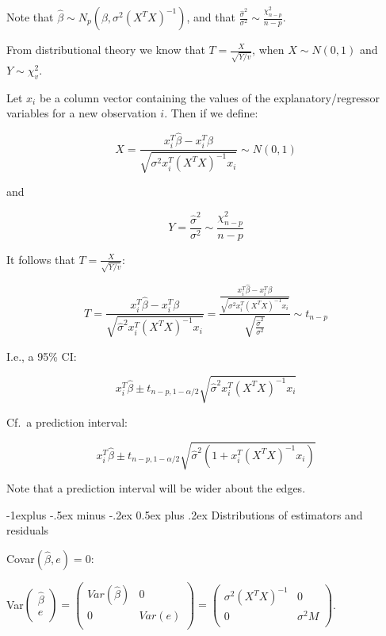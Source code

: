 \documentclass[10pt,landscape]{article}
\makeatletter
\renewcommand{\subsection}{\@startsection{subsection}{2}{0mm}%
                                {-1explus -.5ex minus -.2ex}%
                                {0.5ex plus .2ex}%
                                {\normalfont\normalsize\bfseries}}
\makeatother
\begin{document}
\begin{multicols}{3}
Note that $\hat{\beta} \sim N_p (\beta,\sigma^2 (X^T X)^{-1})$, and that 
$\frac{\hat{\sigma}^2}{\sigma^2} \sim  \frac{\chi^2_{n-p}}{n-p}$.

From distributional theory we know that $T=\frac{X}{\sqrt{Y/v}}$, when $X\sim N(0,1)$ and $Y\sim \chi^2_{v}$. 

Let 
 $x_i$ be a column vector containing the values of the explanatory/regressor variables for a new observation $i$. Then if we define:

\begin{equation}
X=\frac{x_i^T \hat{\beta} - x_i^T \beta}{\sqrt{\sigma^2 x_i^T (X^T X)^{-1}x_i}} \sim N(0,1)
\end{equation}

\noindent
and 

\begin{equation}
Y=\frac{\hat{\sigma}^2}{\sigma^2} \sim  \frac{\chi^2_{n-p}}{n-p}
\end{equation}


It follows that  $T=\frac{X}{\sqrt{Y/v}}$:

\begin{equation}
T=  \frac{x_i^T \hat{\beta} - x_i^T \beta}{\sqrt{\hat{\sigma}^2 x_i^T (X^T X)^{-1}x_i}} = 
\frac{  \frac{x_i^T \hat{\beta} - x_i^T \beta}{\sqrt{\sigma^2 x_i^T (X^T X)^{-1}x_i}}}{\sqrt{\frac{\hat{\sigma}^2}{\sigma^2}}}
 \sim t_{n-p}
\end{equation}

I.e., a 95\% CI:

\begin{equation}
x_i^T \hat{\beta} \pm t_{n-p,1-\alpha/2}\sqrt{\hat{\sigma}^2 x_i^T(X^T X)^{-1}x_i}
\end{equation}

Cf.\ a prediction interval:

\begin{equation}
x_i^T \hat{\beta} \pm t_{n-p,1-\alpha/2}\sqrt{\hat{\sigma}^2 (1+x_i^T(X^T X)^{-1}x_i)}
\end{equation}

Note that a prediction interval will be wider about the edges.

\subsection{Distributions of estimators and residuals}

Covar$(\hat{\beta},e)=0$: 

         Var$\begin{pmatrix}
	 \hat{\beta} \\
	e \\
	\end{pmatrix}
	= 
	\begin{pmatrix}
	 Var(\hat{\beta}) & 0 \\
	 0 & Var(e) \\
	\end{pmatrix}
	= 
	\begin{pmatrix}
	 \sigma^2 (X^T X)^{-1} & 0 \\
	 0 & \sigma^2 M \\
	\end{pmatrix}
	$.
	

\end{multicols}
\end{document}
